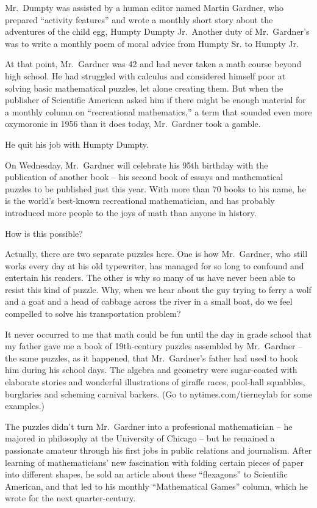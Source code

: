 ﻿\documentclass[12pt]{article}
\begin{document}
Mr.~Dumpty was assisted by a human editor named Martin Gardner, who prepared ``activity features''
and wrote a monthly short story about the adventures of the child egg, Humpty Dumpty Jr.~Another
duty of Mr.~Gardner's was to write a monthly poem of moral advice from Humpty Sr. to Humpty Jr.

At that point, Mr.~Gardner was 42 and had never taken a math course beyond high school. He had
struggled with calculus and considered himself poor at solving basic mathematical puzzles, let alone
creating them. But when the publisher of Scientific American asked him if there might be enough
material for a monthly column on ``recreational mathematics,'' a term that sounded even more
oxymoronic in 1956 than it does today, Mr.~Gardner took a gamble.

He quit his job with Humpty Dumpty.

On Wednesday, Mr.~Gardner will celebrate his 95th birthday with the publication of another book --
his second book of essays and mathematical puzzles to be published just this year. With more than 70
books to his name, he is the world's best-known recreational mathematician, and has probably
introduced more people to the joys of math than anyone in history.

How is this possible?

Actually, there are two separate puzzles here. One is how Mr.~Gardner, who still works every day at
his old typewriter, has managed for so long to confound and entertain his readers. The other is why
so many of us have never been able to resist this kind of puzzle. Why, when we hear about the guy
trying to ferry a wolf and a goat and a head of cabbage across the river in a small boat, do we feel
compelled to solve his transportation problem?

It never occurred to me that math could be fun until the day in grade school that my father gave me
a book of 19th-century puzzles assembled by Mr.~Gardner -- the same puzzles, as it happened, that
Mr.~Gardner's father had used to hook him during his school days. The algebra and geometry were
sugar-coated with elaborate stories and wonderful illustrations of giraffe races, pool-hall
squabbles, burglaries and scheming carnival barkers. (Go to nytimes.com/tierneylab for some
examples.)

The puzzles didn't turn Mr.~Gardner into a professional mathematician -- he majored in philosophy at
the University of Chicago -- but he remained a passionate amateur through his first jobs in public
relations and journalism. After learning of mathematicians' new fascination with folding certain
pieces of paper into different shapes, he sold an article about these ``flexagons'' to Scientific
American, and that led to his monthly ``Mathematical Games'' column, which he wrote for the next
quarter-century.
\end{document}
